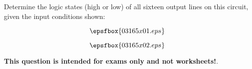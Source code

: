 

Determine the logic states (high or low) of all sixteen output lines on this circuit, given the input conditions shown:

$$\epsfbox{03165x01.eps}$$







$$\epsfbox{03165x02.eps}$$







{\bf This question is intended for exams only and not worksheets!}.




